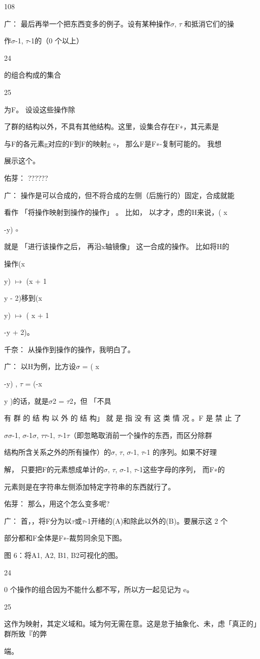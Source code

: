 108\par
广： 最后再举一个把东西变多的例子。设有某种操作$\sigma$, $\tau$ 和抵消它们的操\par
作$\sigma$-1, $\tau$-1的（0 个以上）\par
24\par
的组合构成的集合\par
25\par
为F。 设设这些操作除\par
了群的结构以外，不具有其他结构。这里，设集合存在F∗，其元素是\par
与F的各元素g对应的F到F的映射g $\circ$， 那么F是F∗-复制可能的。 我想\par
展示这个。\par
佑芽： ??????\par
广： 操作是可以合成的，但不将合成的左侧（后施行的）固定，合成就能\par
看作 「将操作映射到操作的操作」 。 比如， 以才才，虑的H来说，( x\par
-y) $\circ$\par
就是 「进行该操作之后， 再沿x轴镜像」 这一合成的操作。 比如将H的\par
操作(x\par
y) $\mapsto$ (x + 1\par
y - 2)移到(x\par
y) $\mapsto$ ( x + 1\par
-y + 2)。\par
千奈： 从操作到操作的操作，我明白了。\par
广： 以H为例，比方设$\sigma$ = ( x\par
-y) , $\tau$ = (-x\par
y )的话，就是$\sigma$2 = $\tau$2，但 「不具\par
有 群 的 结 构 以 外 的 结 构」 就 是 指 没 有 这 类 情 况 。F 是 禁 止 了\par
$\sigma$$\sigma$-1, $\sigma$-1$\sigma$, $\tau$$\tau$-1, $\tau$-1$\tau$（即忽略取消前一个操作的东西，而区分除群\par
结构所含关系之外的所有操作）的$\sigma$, $\tau$, $\sigma$-1, $\tau$-1 的序列。如果不好理\par
解， 只要把F的元素想成单计的$\sigma$, $\tau$, $\sigma$-1, $\tau$-1这些字母的序列， 而F∗的\par
元素则是在字符串左侧添加特定字符串的东西就行了。\par
佑芽： 那么，用这个怎么变多呢?\par
广： 首，，将F分为以$\tau$或$\tau$-1开绪的(A)和除此以外的(B)。要展示这 2 个\par
部分都和F全体是F∗-裁剪同余见下图。\par
图 6：将A1, A2, B1, B2可视化的图。\par
24\par
0 个操作的组合因为不能什么都不写，所以方一起见记为 e。\par
25\par
这作为映射，其定义域和。域为何无需在意。这是怠于抽象化、未，虑「真正的」群所致『的弊\par
端。\par

